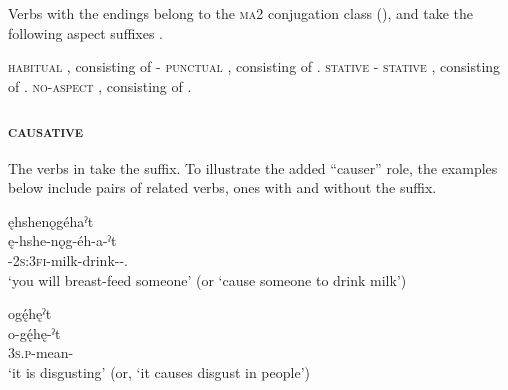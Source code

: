 \z
\z

Verbs with the  endings belong to the \textsc{ma2} conjugation class (), and take the following aspect suffixes .

\ea\label{ex:causex3}
\ea \textsc{habitual} , consisting of  {\causative}-{\habitual}
\ex \textsc{punctual} , consisting of  {\causative}.{\zeropunctual}
\ex \textsc{stative}  {\causative}-{\stative}
\ex \textsc{stative} , consisting of  {\causative}.{\stative}
\ex \textsc{no-aspect} , consisting of  {\causative}.{\noaspect}
\z
\z


\subsubsection{ \textsc{causative}} \label{[-ˀt, -ˀd] (causative)}
The verbs in  take the  {\causative} suffix. To illustrate the added “causer” role, the examples below include pairs of related verbs, ones with and without the  {\causative} suffix.

\ea\label{ex:causex4} 
\ea ęhshenǫgéhaˀt \\
\gll ę-hshe-nǫg-éh-a-ˀt\\
\fut-\textsc{2s:3fi}-milk-drink-{\joinerA}-{\causative}.{\zeropunctual}\\
\glt ‘you will breast-feed someone’ (or ‘cause someone to drink milk’)


\ex ogę́hęˀt\\
\gll o-gę́hę-ˀt\\
\textsc{3s.p}-mean-{\causativestative}\\
\glt ‘it is disgusting’ (or, ‘it causes disgust in people’)


